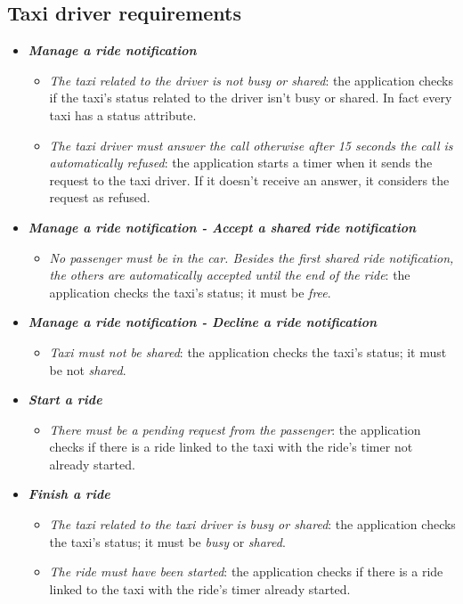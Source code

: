 \subsection{Taxi driver requirements}
\begin{itemize}
\item \textbf{\textit{Manage a ride notification}}
\begin{itemize}
\item \textit{The taxi related to the driver is not busy or shared}: the application checks if the taxi's status related to the driver isn't busy or shared. In fact every taxi has a status attribute.
\item \textit{The taxi driver must answer the call otherwise after 15 seconds the call is automatically refused}: the application starts a timer when it sends the request to the taxi driver. If it doesn't receive an answer, it considers the request as refused.
\end{itemize}

\item \textbf{\textit{Manage a ride notification - Accept a shared ride notification}}
\begin{itemize}
\item \textit{No passenger must be in the car. Besides the first shared ride notification, the others are automatically accepted until the end
of the ride}: the application checks the taxi's status; it must be \textit{free}.
\end{itemize}

\item \textbf{\textit{Manage a ride notification - Decline a ride notification}}
\begin{itemize}
\item \textit{Taxi must not be shared}: the application checks the taxi's status; it must be not \textit{shared}.
\end{itemize}

\item \textbf{\textit{Start a ride}}
\begin{itemize}
\item \textit{There must be a pending request from the passenger}: the application checks if there is a ride linked to the taxi with the ride's timer not already started.
\end{itemize}

\item \textbf{\textit{Finish a ride}}
\begin{itemize}
\item \textit{The taxi related to the taxi driver is busy or shared}: the application checks the taxi's status; it must be \textit{busy} or \textit{shared}.
\item \textit{The ride must have been started}: the application checks if there is a ride linked to the taxi with the ride's timer already started.
\end{itemize}

\end{itemize}

